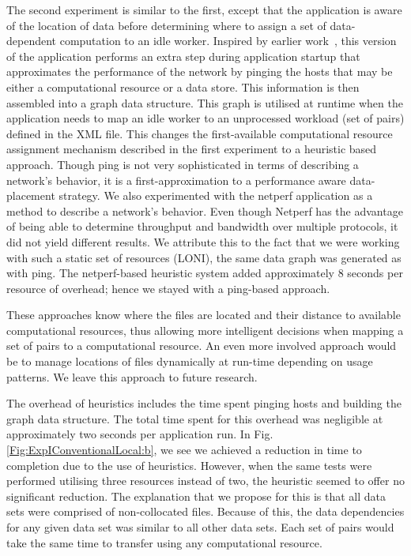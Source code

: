 \documentclass{rspublic}
\begin{document}
The second experiment is similar to the first, except that the
application is aware of the location of data before determining where
to assign a set of data-dependent computation to an idle worker.
Inspired by earlier work~\citep{netperf}, this version of the
application performs an extra step during application startup that
approximates the performance of the network by pinging the hosts that
may be either a computational resource or a data store. This
information is then assembled into a graph data structure. This graph
is utilised at runtime when the application needs to map an idle
worker to an unprocessed workload (set of pairs) defined in the XML
file. This changes the first-available computational resource
assignment mechanism described in the first experiment to a heuristic
based approach. Though ping is not very sophisticated in terms of
describing a network's behavior, it is a first-approximation to a
performance aware data-placement strategy. We also experimented with
the netperf application \citep{netperf_web} as a method to describe a
network's behavior.  Even though Netperf has the advantage of being
able to determine throughput and bandwidth over multiple protocols, it
did not yield different results. We attribute this to the fact that we
were working with such a static set of resources (LONI), the same data
graph was generated as with ping. The netperf-based heuristic system
added approximately 8 seconds per resource of overhead; hence we
stayed with a ping-based approach.

These approaches know where the files are located and their distance
to available computational resources, thus allowing more intelligent
decisions when mapping a set of pairs to a computational resource. An
even more involved approach would be to manage locations of files
dynamically at run-time depending on usage patterns. We leave this
approach to future research.

The overhead of heuristics includes the time spent pinging hosts and
building the graph data structure. The total time spent for this
overhead was negligible at approximately two seconds per application
run. In Fig. \ref{Fig:ExpIConventionalLocal:b}, we see we achieved a
reduction in time to completion due to the use of heuristics. However,
when the same tests were performed utilising three resources instead of
two, the heuristic seemed to offer no significant reduction. The
explanation that we propose for this is that all data sets were
comprised of non-collocated files. Because of this, the data
dependencies for any given data set was similar to all other data sets.
Each set of pairs would take the same time to transfer using any
computational resource.
\end{document}
